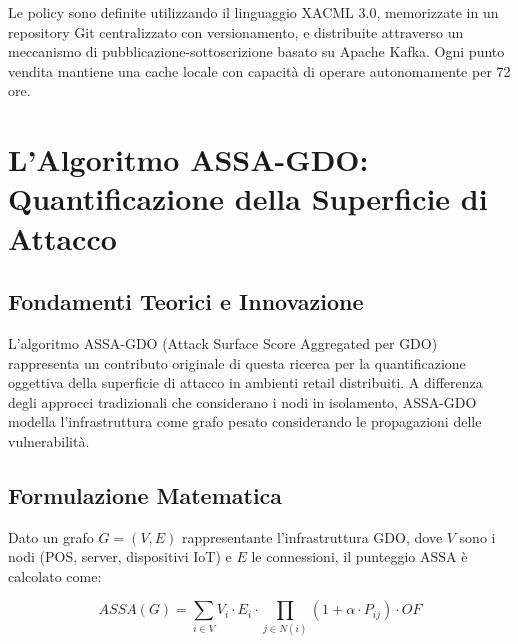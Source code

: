
Le policy sono definite utilizzando il linguaggio XACML 3.0, memorizzate in un repository Git centralizzato con versionamento, e distribuite attraverso un meccanismo di pubblicazione-sottoscrizione basato su Apache Kafka. Ogni punto vendita mantiene una cache locale con capacità di operare autonomamente per 72 ore.


\section{\texorpdfstring{L'Algoritmo ASSA-GDO: Quantificazione della Superficie di Attacco}{2.4 - L'Algoritmo ASSA-GDO: Quantificazione della Superficie di Attacco}}

\subsection{\texorpdfstring{Fondamenti Teorici e Innovazione}{2.4.1 - Fondamenti Teorici e Innovazione}}

L'algoritmo ASSA-GDO (Attack Surface Score Aggregated per GDO) rappresenta un contributo originale di questa ricerca per la quantificazione oggettiva della superficie di attacco in ambienti retail distribuiti. A differenza degli approcci tradizionali che considerano i nodi in isolamento, ASSA-GDO modella l'infrastruttura come grafo pesato considerando le propagazioni delle vulnerabilità.

\subsection{\texorpdfstring{Formulazione Matematica}{2.4.2 - Formulazione Matematica}}

Dato un grafo $G = (V, E)$ rappresentante l'infrastruttura GDO, dove $V$ sono i nodi (POS, server, dispositivi IoT) e $E$ le connessioni, il punteggio ASSA è calcolato come:

\begin{equation}
ASSA(G) = \sum_{i \in V} V_i \cdot E_i \cdot \prod_{j \in N(i)} (1 + \alpha \cdot P_{ij}) \cdot OF
\end{equation}

